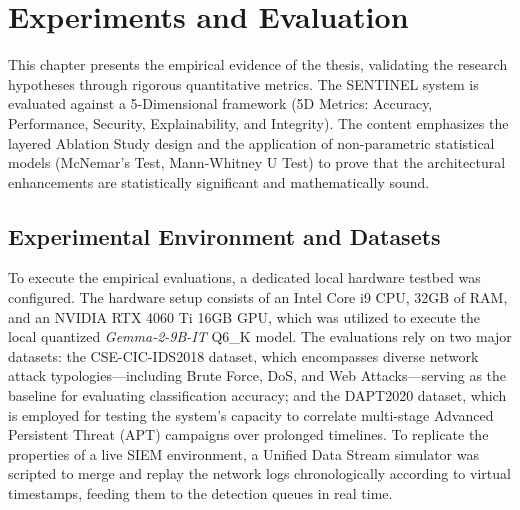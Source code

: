 \chapter{Experiments and Evaluation}
\label{ch:experiments_evaluation}

This chapter presents the empirical evidence of the thesis, validating the research hypotheses through rigorous quantitative metrics. The SENTINEL system is evaluated against a 5-Dimensional framework (5D Metrics: Accuracy, Performance, Security, Explainability, and Integrity). The content emphasizes the layered Ablation Study design and the application of non-parametric statistical models (McNemar's Test, Mann-Whitney U Test) to prove that the architectural enhancements are statistically significant and mathematically sound.

\section{Experimental Environment and Datasets}
To execute the empirical evaluations, a dedicated local hardware testbed was configured. The hardware setup consists of an Intel Core i9 CPU, 32GB of RAM, and an NVIDIA RTX 4060 Ti 16GB GPU, which was utilized to execute the local quantized \textit{Gemma-2-9B-IT} Q6\_K model. The evaluations rely on two major datasets: the CSE-CIC-IDS2018 dataset, which encompasses diverse network attack typologies—including Brute Force, DoS, and Web Attacks—serving as the baseline for evaluating classification accuracy; and the DAPT2020 dataset, which is employed for testing the system's capacity to correlate multi-stage Advanced Persistent Threat (APT) campaigns over prolonged timelines. To replicate the properties of a live SIEM environment, a Unified Data Stream simulator was scripted to merge and replay the network logs chronologically according to virtual timestamps, feeding them to the detection queues in real time.

